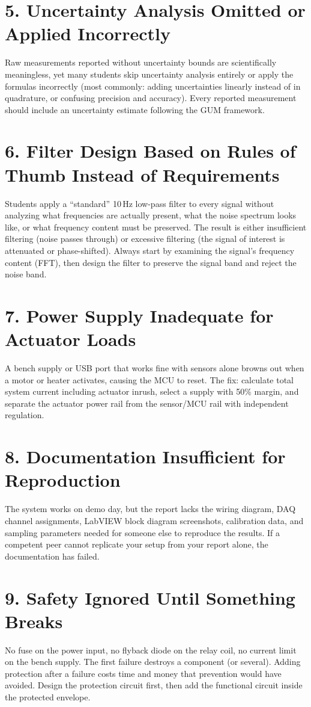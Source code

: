 \documentclass[11pt,letterpaper,twoside,openany]{book}
\begin{document}
\section*{5. Uncertainty Analysis Omitted or Applied Incorrectly}
Raw measurements reported without uncertainty bounds are scientifically meaningless, yet many students skip uncertainty analysis entirely or apply the formulas incorrectly (most commonly: adding uncertainties linearly instead of in quadrature, or confusing precision and accuracy). Every reported measurement should include an uncertainty estimate following the GUM framework.

\section*{6. Filter Design Based on Rules of Thumb Instead of Requirements}
Students apply a ``standard'' 10\,Hz low-pass filter to every signal without analyzing what frequencies are actually present, what the noise spectrum looks like, or what frequency content must be preserved. The result is either insufficient filtering (noise passes through) or excessive filtering (the signal of interest is attenuated or phase-shifted). Always start by examining the signal's frequency content (FFT), then design the filter to preserve the signal band and reject the noise band.

\section*{7. Power Supply Inadequate for Actuator Loads}
A bench supply or USB port that works fine with sensors alone browns out when a motor or heater activates, causing the MCU to reset. The fix: calculate total system current including actuator inrush, select a supply with 50\% margin, and separate the actuator power rail from the sensor/MCU rail with independent regulation.

\section*{8. Documentation Insufficient for Reproduction}
The system works on demo day, but the report lacks the wiring diagram, DAQ channel assignments, LabVIEW block diagram screenshots, calibration data, and sampling parameters needed for someone else to reproduce the results. If a competent peer cannot replicate your setup from your report alone, the documentation has failed.

\section*{9. Safety Ignored Until Something Breaks}
No fuse on the power input, no flyback diode on the relay coil, no current limit on the bench supply. The first failure destroys a component (or several). Adding protection after a failure costs time and money that prevention would have avoided. Design the protection circuit first, then add the functional circuit inside the protected envelope.
\end{document}
